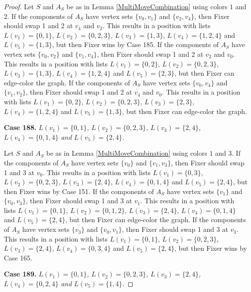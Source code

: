 \documentclass[12pt]{amsart}
\theoremstyle{plain}
\theoremstyle{definition}
\theoremstyle{remark}
\begin{document}
\begin{proof}
Let $S$ and $A_S$ be as in Lemma \ref{MultiMoveCombination} using colors $1$ and $2$. If the components of $A_S$ have vertex sets $\{v_0, v_1\}$ and $\{v_2, v_4\}$, then Fixer should swap 1 and 2 at $v_4$ and $v_2$. This results in a position with lists $L(v_1) = \{0, 1\}$, $L(v_2) = \{0, 2, 3\}$, $L(v_3) = \{1, 3\}$, $L(v_4) = \{1, 2, 4\}$ and $L(v_5) = \{1, 3\}$, but then Fixer wins by Case 185.
If the components of $A_S$ have vertex sets $\{v_0, v_2\}$ and $\{v_1, v_4\}$, then Fixer should swap 1 and 2 at $v_2$ and $v_0$. This results in a position with lists $L(v_1) = \{0, 2\}$, $L(v_2) = \{0, 2, 3\}$, $L(v_3) = \{1, 3\}$, $L(v_4) = \{1, 2, 4\}$ and $L(v_5) = \{2, 3\}$, but then Fixer can edge-color the graph.
If the components of $A_S$ have vertex sets $\{v_0, v_4\}$ and $\{v_1, v_2\}$, then Fixer should swap 1 and 2 at $v_4$ and $v_0$. This results in a position with lists $L(v_1) = \{0, 2\}$, $L(v_2) = \{0, 2, 3\}$, $L(v_3) = \{2, 3\}$, $L(v_4) = \{1, 2, 4\}$ and $L(v_5) = \{1, 3\}$, but then Fixer can edge-color the graph.

\noindent\textbf{Case 188.  }\textit{$L(v_1) = \{0, 1\}$, $L(v_2) = \{0, 2, 3\}$, $L(v_3) = \{2, 4\}$, $L(v_4) = \{0, 1, 4\}$ and $L(v_5) = \{2, 4\}$.}

Let $S$ and $A_S$ be as in Lemma \ref{MultiMoveCombination} using colors $1$ and $3$. If the components of $A_S$ have vertex sets $\{v_0\}$ and $\{v_1, v_3\}$, then Fixer should swap 1 and 3 at $v_0$. This results in a position with lists $L(v_1) = \{0, 3\}$, $L(v_2) = \{0, 2, 3\}$, $L(v_3) = \{2, 4\}$, $L(v_4) = \{0, 1, 4\}$ and $L(v_5) = \{2, 4\}$, but then Fixer wins by Case 151.
If the components of $A_S$ have vertex sets $\{v_1\}$ and $\{v_0, v_3\}$, then Fixer should swap 1 and 3 at $v_1$. This results in a position with lists $L(v_1) = \{0, 1\}$, $L(v_2) = \{0, 1, 2\}$, $L(v_3) = \{2, 4\}$, $L(v_4) = \{0, 1, 4\}$ and $L(v_5) = \{2, 4\}$, but then Fixer can edge-color the graph.
If the components of $A_S$ have vertex sets $\{v_3\}$ and $\{v_0, v_1\}$, then Fixer should swap 1 and 3 at $v_3$. This results in a position with lists $L(v_1) = \{0, 1\}$, $L(v_2) = \{0, 2, 3\}$, $L(v_3) = \{2, 4\}$, $L(v_4) = \{0, 3, 4\}$ and $L(v_5) = \{2, 4\}$, but then Fixer wins by Case 165.

\noindent\textbf{Case 189.  }\textit{$L(v_1) = \{0, 1\}$, $L(v_2) = \{0, 2, 3\}$, $L(v_3) = \{2, 4\}$, $L(v_4) = \{0, 2, 4\}$ and $L(v_5) = \{1, 4\}$.}


\end{proof}
\end{document}

